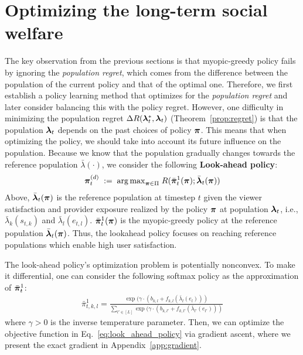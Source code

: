 



\section{Optimizing the long-term social welfare} \label{sec:proposal}

The key observation from the previous sections is that myopic-greedy policy fails by ignoring the \textit{population regret}, which comes from the difference between the population of the current policy and that of the optimal one. Therefore, we first establish a policy learning method that optimizes for the \textit{population regret} and later consider balancing this with the policy regret. 
However, one difficulty in minimizing the population regret $\Delta R(\bm{\lambda}_t^{\ast}, \bm{\lambda}_t)$ (Theorem~\ref{prop:regret}) is that the population $\bm{\lambda}_{t}$ depends on the past choices of policy $\bm{\pi}$. This means that when optimizing the policy, we should take into account its future influence on the population. 
Because we know that the population gradually changes towards the reference population $\bar{\lambda}(\cdot)$, we consider the following \textbf{Look-ahead policy}:
\begin{align}
    \bm{\pi}_t^{(d)} \; := \; {\arg\max}_{\bm{\pi} \in \Pi} \; R(\bar{\bm{\pi}}_t^{1}(\bm{\pi}); \bar{\bm{\lambda}}_t(\bm{\pi})) \label{eq:look_ahead_policy}
\end{align}
Above, $\bar{\bm{\lambda}}_t(\bm{\pi})$ is the reference population at timestep $t$ given the viewer satisfaction and provider exposure realized by the policy $\bm{\pi}$ at population $\bm{\lambda}_t$, i.e., $\bar{\lambda}_k(s_{t, k})$ and $\bar{\lambda}_l(e_{t, l})$. 
$\bar{\bm{\pi}}_t^{1}(\bm{\pi})$ is the myopic-greedy policy at the reference population $\bar{\bm{\lambda}}_t(\bm{\pi})$. 
Thus, the lookahead policy focuses on reaching reference populations which enable high user satisfaction.

The look-ahead policy's optimization problem is potentially nonconvex.
To make it differential, one can consider the following softmax policy as the approximation of $\bar{\bm{\pi}}_t^{1}$:
\begin{align*}
    \bar{\pi}_{t,k,l}^{1} = \frac{\exp(\gamma \cdot (b_{k,l} + f_{k,l}(\bar{\lambda}_l(e_l)))}{\sum_{l' \in [L]} \exp(\gamma \cdot (b_{k,l'} + f_{k,l'}(\bar{\lambda}_{l'}(e_{l'})))} 
\end{align*}
where $\gamma > 0$ is the inverse temperature parameter. Then, we can optimize the objective function in Eq.~\eqref{eq:look_ahead_policy} via gradient ascent, where we present the exact gradient in Appendix~\ref{app:gradient}.

